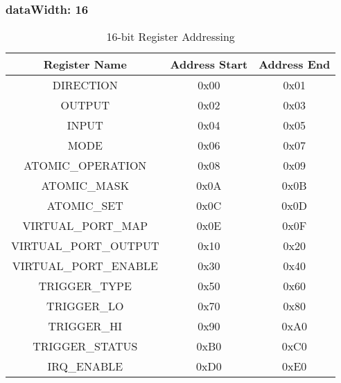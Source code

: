\subsubsection{dataWidth: 16}
\begin{table}[h]
  \centering
  \begin{tabular}{|c|c|c|}
      \hline
      \textbf{Register Name} & \textbf{Address Start} & \textbf{Address End} \\ \hline
      DIRECTION & 0x00 & 0x01 \\ \hline
      OUTPUT & 0x02 & 0x03\\ \hline
      INPUT & 0x04 & 0x05 \\ \hline
      MODE & 0x06 & 0x07 \\ \hline
      ATOMIC\_OPERATION & 0x08 & 0x09 \\ \hline
      ATOMIC\_MASK & 0x0A & 0x0B\\ \hline
      ATOMIC\_SET & 0x0C & 0x0D \\ \hline
      VIRTUAL\_PORT\_MAP & 0x0E & 0x0F \\ \hline
      VIRTUAL\_PORT\_OUTPUT & 0x10 & 0x20 \\ \hline
      VIRTUAL\_PORT\_ENABLE & 0x30 & 0x40 \\ \hline
      TRIGGER\_TYPE & 0x50 & 0x60 \\ \hline
      TRIGGER\_LO & 0x70 & 0x80 \\ \hline
      TRIGGER\_HI & 0x90 & 0xA0 \\ \hline
      TRIGGER\_STATUS & 0xB0 & 0xC0 \\ \hline
      IRQ\_ENABLE & 0xD0 & 0xE0 \\ \hline
  \end{tabular}
  \caption{16-bit Register Addressing}
\end{table}


\newpage

